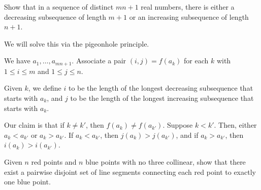 \documentclass[10pt]{mypackage}
\begin{document}
\begin{problem}
  Show that in a sequence of distinct $mn + 1$ real numbers, there is either a decreasing subsequence of length $m + 1$ or an increasing subsequence of length $n + 1$.
\end{problem}
%
\begin{solution}
  We will solve this via the pigeonhole principle.\newline

  We have $a_1,\dots,a_{mn + 1}$. Associate a pair $\left( i,j \right) = f\left(a_{k}\right)$ for each $k$ with $1 \leq i \leq m$ and $1 \leq j \leq n$.\newline

  Given $k$, we define $i$ to be the length of the longest decreasing subsequence that starts with $a_k$, and $j$ to be the length of the longest increasing subsequence that starts with $a_k$.\newline

  Our claim is that if $k \neq k'$, then $f\left( a_k \right)\neq f\left( a_{k'} \right)$. Suppose $k < k'$. Then, either $a_{k}  < a_{k'}$ or $a_k > a_{k'}$. If $a_k < a_{k'}$, then $j\left(a_k\right) > j\left( a_{k'} \right)$, and if $a_k > a_{k'}$, then $i\left( a_k \right) > i\left( a_{k'} \right)$.
\end{solution}
\begin{problem}
  Given $n$ red points and $n$ blue points with no three collinear, show that there exist a pairwise disjoint set of line segments connecting each red point to exactly one blue point.
\end{problem}
\end{document}
